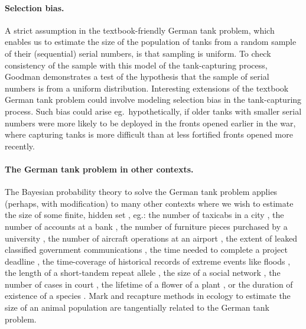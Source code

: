 \documentclass[11pt, oneside]{article}
\begin{document}
\paragraph{Selection bias.}
A strict assumption in the textbook-friendly German tank problem, which enables us to estimate the size of the population of tanks from a random sample of their (sequential) serial numbers, is that sampling is uniform. 
To check consistency of the sample with this model of the tank-capturing process, Goodman \cite{goodman1954some} demonstrates a test of the hypothesis that the sample of serial numbers is from a uniform distribution. 
Interesting extensions of the textbook German tank problem could involve modeling selection bias in the tank-capturing process. 
Such bias could arise eg.\ hypothetically, if older tanks with smaller serial numbers were more likely to be deployed in the fronts opened earlier in the war, where capturing tanks is more difficult than at less fortified fronts opened more recently.


\paragraph{The German tank problem in other contexts.}
The Bayesian probability theory to solve the German tank problem applies (perhaps, with modification) to many other contexts where we wish to estimate the size of some finite, hidden set \cite{cheng2020estimating}, eg.: the number of taxicabs in a city \cite{grajalez2013great,comap}, the number of accounts at a bank \cite{hohle2006bayesian}, the number of furniture pieces purchased by a university \cite{goodman1954some}, the number of aircraft operations at an airport \cite{mott2016estimation}, the extent of leaked classified government communications \cite{gill2015estimating}, the time needed to complete a project deadline \cite{fehlmann2017new}, the time-coverage of historical records of extreme events like floods \cite{prosdocimi2018german}, 
 the length of a short-tandem repeat allele \cite{tang2017profiling}, the size of a social network \cite{katzir2011estimating}, the number of cases in court \cite{wu2022augmenting}, the lifetime of a flower of a plant \cite{pearse2017statistical}, or the duration of existence of a species \cite{roberts2003did}.
Mark and recapture methods in ecology to estimate the size of an animal population \cite{nichols1992capture,chao2001overview} are tangentially related to the German tank problem.
\end{document}
